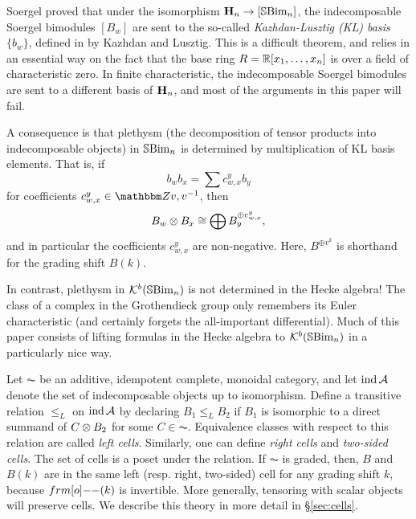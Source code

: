 Soergel \cite{Soer90} proved that under the isomorphism ${\mathbf H}_n \rightarrow [{\mathbb{S}}{\rm Bim }_n]$, the indecomposable Soergel bimodules $[B_w]$ are sent to the so-called \emph{Kazhdan-Lusztig (KL) basis}
$\{b_w\}$, defined in \cite{KazLus79} by Kazhdan and Lusztig. This is a difficult theorem, and relies in an essential way on the fact that the base ring $R = {\mathbb{R}}[x_1, \ldots, x_n]$ is
over a field of characteristic zero. In finite characteristic, the indecomposable Soergel bimodules are sent to a different basis of ${\mathbf H}_n$, and most of the arguments in this paper
will fail.

A consequence is that plethysm (the decomposition of tensor products into indecomposable objects) in ${\mathbb{S}}{\rm Bim }_n$ is determined by multiplication of KL basis
elements. That is, if \begin{equation} \label{eq:structurecoeffsintro} b_w b_x = \sum c^y_{w,x} b_y \end{equation} for coefficients $c^y_{w,x} \in \Z{v,v\inv}$, then \begin{equation} B_w
\otimes B_x \cong \bigoplus B_y^{\oplus c^y_{w,x}},\end{equation} and in particular the coefficients $c^y_{w,x}$ are non-negative. Here, $B^{\oplus v^k}$ is shorthand for the grading shift
$B(k)$.


\begin{remark} In contrast, plethysm in ${\mathcal{K}}^b({\mathbb{S}}{\rm Bim }_n)$ is not determined in the Hecke algebra! The class of a complex in the Grothendieck group only remembers its Euler characteristic (and certainly forgets the all-important differential).  Much of this paper consists of lifting formulas in the Hecke algebra to ${\mathcal{K}}^b({\mathbb{S}}{\rm Bim }_n)$ in a particularly nice way. \end{remark}


Let $\AC$ be an additive, idempotent complete, monoidal category, and let $\operatorname{ind} {\mathcal{A}}$ denote the set of indecomposable objects up to isomorphism. Define a transitive relation $\le_L$ on
$\operatorname{ind} {\mathcal{A}}$ by declaring $B_1 \le_L B_2$ if $B_1$ is isomorphic to a direct summand of $C \otimes B_2$ for some $C \in \AC$. Equivalence classes with respect to this relation are called
\emph{left cells}. Similarly, one can define \emph{right cells} and \emph{two-sided cells}. The set of cells is a poset under the relation. If $\AC$ is graded, then, $B$ and $B(k)$ are
in the same left (resp. right, two-sided) cell for any grading shift $k$, because $\one(k)$ is invertible. More generally, tensoring with scalar objects will preserve cells. We describe this theory in more
detail in \S\ref{sec:cells}.

